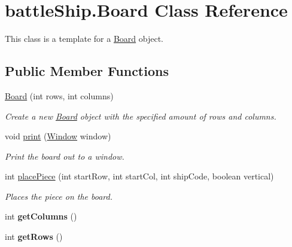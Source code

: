 \hypertarget{classbattleShip_1_1Board}{\section{battle\-Ship.\-Board Class Reference}
\label{classbattleShip_1_1Board}
}


This class is a template for a \hyperlink{classbattleShip_1_1Board}{Board} object.  


\subsection*{Public Member Functions}
\begin{DoxyCompactItemize}
\item 
\hyperlink{classbattleShip_1_1Board_ab29903dca128c549a04ef1bd8a03e284}{Board} (int rows, int columns)
\begin{DoxyCompactList}\small\item\em Create a new \hyperlink{classbattleShip_1_1Board}{Board} object with the specified amount of rows and columns. \end{DoxyCompactList}\item 
void \hyperlink{classbattleShip_1_1Board_a37632e4b600f3bcb1b196c90d7371a62}{print} (\hyperlink{classbattleShip_1_1Window}{Window} window)
\begin{DoxyCompactList}\small\item\em Print the board out to a window. \end{DoxyCompactList}\item 
int \hyperlink{classbattleShip_1_1Board_a7f3ee785960f0a29eb066a0cc76e925b}{place\-Piece} (int start\-Row, int start\-Col, int ship\-Code, boolean vertical)
\begin{DoxyCompactList}\small\item\em Places the piece on the board. \end{DoxyCompactList}\item 
\hypertarget{classbattleShip_1_1Board_aa6205fe92d7e29d281c383f5e57384ad}{int {\bfseries get\-Columns} ()}\label{classbattleShip_1_1Board_aa6205fe92d7e29d281c383f5e57384ad}

\item 
\hypertarget{classbattleShip_1_1Board_aec4594650e89c01f94f43851d81ea887}{int {\bfseries get\-Rows} ()}\label{classbattleShip_1_1Board_aec4594650e89c01f94f43851d81ea887}

\end{DoxyCompactItemize}
